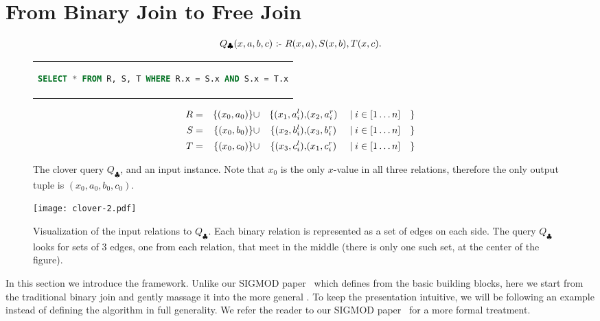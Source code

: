 \section{From Binary Join to Free Join}\label{sec:background}

\begin{figure}
  \begin{align*}
    Q_{\clubsuit}(x,a,b,c) \text{ :- } R(x,a),S(x,b),T(x,c).
  \end{align*}
  \begin{center}
    \begin{tabular}{c}
      \begin{lstlisting}[language=SQL, numbers=none]
SELECT * FROM R, S, T WHERE R.x = S.x AND S.x = T.x
\end{lstlisting}
    \end{tabular}
  \end{center}
  \begin{alignat*}{8}
    R & = & \{(x_0, a_0)\} & \cup & \{(x_1, a_i^l), & (x_2, a_i^r) &  & \mid i \in [1 \ldots n] & \} \\
    S & = & \{(x_0, b_0)\} & \cup & \{(x_2, b_i^l), & (x_3, b_i^r) &  & \mid i \in [1 \ldots n] & \} \\
    T & = & \{(x_0, c_0)\} & \cup & \{(x_3, c_i^l), & (x_1, c_i^r) &  & \mid i \in [1 \ldots n] & \}
  \end{alignat*}
  \caption{The clover query $Q_\clubsuit$, and an input instance.
    Note that $x_0$ is the only $x$-value in all three relations,
    therefore the only output tuple is $(x_0, a_0, b_0, c_0)$. }
  \label{fig:clover-query}
\end{figure}

\begin{figure}
  \texttt{[image: clover-2.pdf]}
  \caption{Visualization of the input relations to $Q_\clubsuit$.
    Each binary relation is represented as a set of edges on each side.
    The query $Q_\clubsuit$ looks for sets of 3 edges, one from each relation,
    that meet in the middle (there is only one such set, at the center of the figure).}
  \label{fig:clover-Visualization}
\end{figure}

In this section we introduce the \FJ framework.
Unlike our SIGMOD paper~\cite{10.1145/3589295} which defines \FJ from
the basic building blocks,
here we start from the traditional binary join
and gently massage it into the more general \FJ.
To keep the presentation intuitive,
we will be following an example instead of
defining the algorithm in full generality.
We refer the reader to our SIGMOD paper~\cite{10.1145/3589295}
for a more formal treatment.

